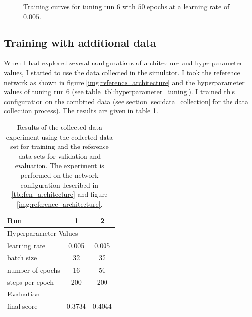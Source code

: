 \documentclass[11pt, onecolumn, oneside, reqno]{article}
\begin{document}
{{{\begin{figure}
\noindent
{}
\caption[Training curves for tuning run 6]{Training curves for tuning run $6$ with $50$ epochs at a learning rate of $0.005$.}
\label{img:training_curves_tune_6}
\end{figure}

\subsection{Training with additional data}
\label{sec:training_additional_data}
When I had explored several configurations of architecture and hyperparameter values, I started to use the data collected in the simulator. I took the reference network as shown in figure \ref{img:reference_architecture} and the hyperparameter values of tuning run $6$ (see table \ref{tbl:hyperparameter_tuning}). I trained this configuration on the combined data (see section \ref{sec:data_collection} for the data collection process). The results are given in table \ref{tbl:collected_data_experiment}.

{\renewcommand{\arraystretch}{2}%
\begin{table}
\centering
\begin{tabular}{|l|c|c|}
\hline 
Run & 1 & 2 \\
\hline  
\multicolumn{3}{l}{Hyperparameter Values}\\
\hline
learning rate    & 0.005 & 0.005 \\
batch size       & 32    & 32    \\
number of epochs & 16    & 50    \\
steps per epoch  & 200   & 200   \\
\hline 
\multicolumn{3}{l}{Evaluation}\\
\hline
final score & 0.3734 & 0.4044  \\
\hline 
\end{tabular}
\caption[Collected data experiment]{Results of the collected data experiment using the collected data set for training and the reference data sets for validation and evaluation. The experiment is performed on the network configuration described in \ref{tbl:fcn_architecture} and figure \ref{img:reference_architecture}.}
\label{tbl:collected_data_experiment}
\end{table}

}}}}
\end{document}
